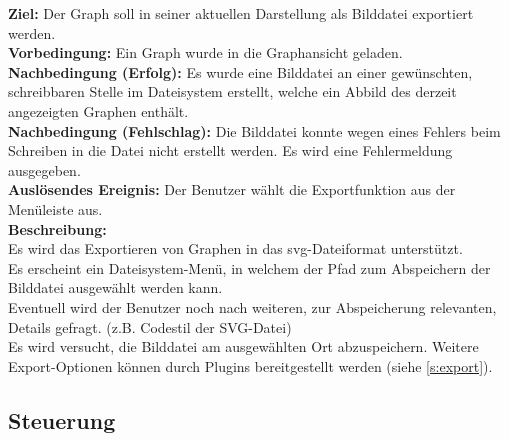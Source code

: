 \label{fa:export_img}
\textbf{Ziel:} Der Graph soll in seiner aktuellen Darstellung als Bilddatei exportiert werden.\\
\textbf{Vorbedingung:} Ein Graph wurde in die Graphansicht geladen. \\
\textbf{Nachbedingung (Erfolg):} Es wurde eine Bilddatei an einer gewünschten, schreibbaren Stelle im Dateisystem erstellt, welche ein Abbild des derzeit angezeigten Graphen enthält.\\
\textbf{Nachbedingung (Fehlschlag):} Die Bilddatei konnte wegen eines Fehlers beim Schreiben in die Datei nicht erstellt werden. Es wird eine Fehlermeldung ausgegeben.\\
\textbf{Auslösendes Ereignis:}
Der Benutzer wählt die Exportfunktion aus der Menüleiste aus.\\
\textbf{Beschreibung:}\\
Es wird das Exportieren von Graphen in das \gls{svg}-Dateiformat unterstützt.\\
Es erscheint ein Dateisystem-Menü, in welchem der Pfad zum Abspeichern der Bilddatei ausgewählt werden kann.\\
Eventuell wird der Benutzer noch nach weiteren, zur Abspeicherung relevanten, Details gefragt. (z.B. Codestil der SVG-Datei)\\
Es wird versucht, die Bilddatei am ausgewählten Ort abzuspeichern.
Weitere Export-Optionen können durch Plugins bereitgestellt werden (siehe \ref{s:export}).

\subsection{Steuerung}
\setcounter{fanr}{200}

